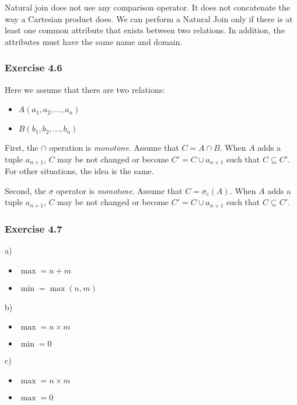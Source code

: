 Natural join does not use any comparison operator. It
does not concatenate the way a Cartesian product does.
We can perform a Natural Join only if there is at least
one common attribute that exists between two relations.
In addition, the attributes must have the same name and
domain.

\subsubsection*{Exercise 4.6}

Here we assume that there are two relations:

\begin{itemize}
  \item $A(a_{1},a_{2},\dots,a_{n})$
  \item $B(b_{1},b_{2},\dots,b_{n})$
\end{itemize}

First, the $\cap$ operation is \emph{monotone}. Assume that
$C = A \cap B$. When $A$ adds a tuple $a_{n + 1}$, $C$ may
be not changed or become $C' = C \cup a_{n + 1}$ such that
$C \subseteq C'$. For other situations, the idea is the same.

Second, the $\sigma$ operator is \emph{monotone}. Assume that
$C = \sigma_{c}(A)$. When $A$ adds a tuple $a_{n + 1}$, $C$ may
be not changed or become $C' = C \cup a_{n + 1}$ such that
$C \subseteq C'$.

\subsubsection*{Exercise 4.7}

a)

\begin{itemize}
  \item $\max =  n + m$
  \item $\min = \max(n, m)$
\end{itemize}

b)

\begin{itemize}
  \item $\max = n \times m$
  \item $\min = 0$
\end{itemize}

c)

\begin{itemize}
  \item $\max = n \times m$
  \item $\max = 0$
\end{itemize}

